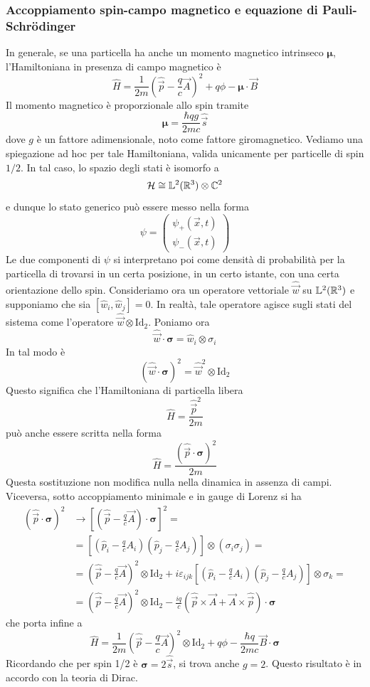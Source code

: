 \documentclass[a4paper, 11pt]{article}
\newcommand{\op}[1]{\hat{#1}}
\renewcommand{\H}{\mathcal{H}}
\newcommand{\id}{\mathrm{Id}}
\renewcommand{\op}[1]{\hat{#1}}
\renewcommand{\L}{\mathbb{L}}
\newcommand{\ham}{\hat{H}}
\begin{document}
\subsubsection{Accoppiamento spin-campo magnetico e equazione di Pauli-Schr\"odinger}
In generale, se una particella ha anche un momento magnetico intrinseco $\bm{\mu}$, l'Hamiltoniana in presenza di campo magnetico è
\[\ham=\frac{1}{2m}\left(\op{\vec{p}}-\frac{q}{c}{\vec{A}}\right)^2+q\phi-\bm\mu\cdot\vec{B}\]
Il momento magnetico è proporzionale allo spin tramite
\[\bm{\mu}=\frac{\hbar qg}{2mc}\op{\vec{s}}\]
dove $g$ è un fattore adimensionale, noto come fattore giromagnetico. Vediamo una spiegazione ad hoc per tale Hamiltoniana, valida unicamente per particelle di spin $1/2$. In tal caso, lo spazio degli stati è isomorfo a
\[\H\cong\L^2(\R ^3)\otimes\C ^2\]
e dunque lo stato generico può essere messo nella forma
\[\psi=\left(\begin{array}{c}
\psi_+(\vec{x},t)\\\psi_-(\vec{x},t)
\end{array}\right)\]
Le due componenti di $\psi$ si interpretano poi come densità di probabilità per la particella di trovarsi in un certa posizione, in un certo istante, con una certa orientazione dello spin. Consideriamo ora un operatore vettoriale $\op{\vec{w}}$ su $\L^2(\R^3)$ e supponiamo che sia $[\op w_i,\op w_j]=0$. In realtà, tale operatore agisce sugli stati del sistema come l'operatore $\op{\vec{w}}\otimes\id_2$. Poniamo ora
\[\op{\vec{w}}\cdot\bm{\sigma}=\op w_i\otimes\sigma_i\]
In tal modo è
\[(\op{\vec{w}}\cdot\bm{\sigma})^2=\op{\vec{w}}^2\otimes\id_2\]
Questo significa che l'Hamiltoniana di particella libera
\[\ham=\frac{\op{\vec{p}}^2}{2m}\]
può anche essere scritta nella forma
\[\ham=\frac{(\op{\vec{p}}\cdot\bm{\sigma})^2}{2m}\]
Questa sostituzione non modifica nulla nella dinamica in assenza di campi. Viceversa, sotto accoppiamento minimale e in gauge di Lorenz si ha
\begin{align*}
	(\op{\vec{p}}\cdot\bm{\sigma})^2&\to\left[\left(\op{\vec{p}}-\frac{q}{c}\vec{A}\right)\cdot\bm{\sigma}\right]^2=\\&=\left[\left(\op{p}_i-\frac{q}{c}A_i\right)\left(\op{p}_j-\frac{q}{c}A_j\right)\right]\otimes(\sigma_i\sigma_j)=\\&=\left(\op{\vec{p}}-\frac{q}{c}\vec{A}\right)^2\otimes\id_2+i\varepsilon_{ijk}\left[\left(\op{p}_i-\frac{q}{c}A_i\right)\left(\op{p}_j-\frac{q}{c}A_j\right)\right]\otimes\sigma_k=\\&=\left(\op{\vec{p}}-\frac{q}{c}\vec{A}\right)^2\otimes\id_2-\frac{iq}{c}\left(\op{\vec{p}}\times\vec{A}+\vec{A}\times\op{\vec{p}}\right)\cdot\bm{\sigma}
\end{align*}
che porta infine a 
\[\ham=\frac{1}{2m}\left(\op{\vec{p}}-\frac{q}{c}\vec{A}\right)^2\otimes\id_2+q\phi-\frac{\hbar q}{2mc}\vec{B}\cdot\bm{\sigma}\]
Ricordando che per spin 1/2 è $\bm\sigma=2\op{\vec{s}}$, si trova anche $g=2$. Questo risultato è in accordo con la teoria di Dirac.
\end{document}
